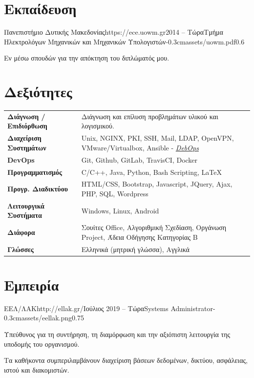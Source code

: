 \documentclass{mycv}
\begin{document}
	\section{Εκπαίδευση}
	
	\begin{EntryDatedLogo}{Πανεπιστήμιο Δυτικής Μακεδονίας}{https://ece.uowm.gr}{2014 -- Τώρα}{Τμήμα Ηλεκτρολόγων Μηχανικών και Μηχανικών Υπολογιστών}{-0.3cm}{assets/uowm.pdf}{0.6}
	\begin{Itemize}
		\item Εν μέσω σπουδών για την απόκτηση του διπλώματός μου.
	\end{Itemize}
	\end{EntryDatedLogo}

	\section{Δεξιότητες}
	\begin{tabular}{m{4.5cm} m{13cm}}
		\textbf{Διάγνωση / Επιδιόρθωση}     & Διάγνωση και επίλυση προβλημάτων υλικού και λογισμικού. \\
		\textbf{Διαχείριση Συστημάτων}		& Unix, NGINX, PKI, SSH, Mail, LDAP, OpenVPN, VMware/Virtualbox, Ansible - \href{https://debops.org}{\textit{DebOps}} \\
		\textbf{DevOps}	                    & Git, Github, GitLab, TravisCI, Docker \\
		\textbf{Προγραμματισμός} 	 	  	& C/C++, Java, Python, Bash Scripting, \LaTeX \\
		\textbf{Προγρ. Διαδικτύου}	  		& HTML/CSS, Bootstrap, Javascript, JQuery, Ajax, PHP, SQL, Wordpress \\
		\textbf{Λειτουργικά Συστήματα}   	& Windows, Linux, Android \\
		\textbf{Διάφορα}        		 	& Σουίτες Office, Αλγοριθμική Σχεδίαση, Οργάνωση Project, Άδεια Οδήγησης Κατηγορίας Β \\
		\textbf{Γλώσσες} 			   		& Ελληνικά (μητρική γλώσσα), Αγγλικά 
	\end{tabular}

	\section{Εμπειρία}
	
	\begin{EntryDatedLogo}{ΕΕΛ/ΛΑΚ}{http://ellak.gr/}{Ιούλιος 2019 -- Τώρα}{Systems Administrator}{-0.3cm}{assets/eellak.png}{0.75}
		\begin{Itemize}
			\item Υπεύθυνος για τη συντήρηση, τη διαμόρφωση και την αξιόπιστη λειτουργία της υποδομής του οργανισμού. 
			\item Τα καθήκοντα συμπεριλαμβάνουν διαχείριση βάσεων δεδομένων, δικτύου, ασφάλειας, ιστού και διακομιστών.
		\end{Itemize}
	\end{EntryDatedLogo}
\end{document}
